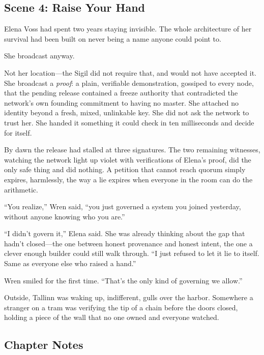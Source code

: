 \hypertarget{scene-4-raise-your-hand}{%
\subsection{Scene 4: Raise Your
Hand}\label{scene-4-raise-your-hand}}

Elena Voss had spent two years staying invisible. The whole architecture of her
survival had been built on never being a name anyone could point to.

She broadcast anyway.

Not her location---the Sigil did not require that, and would not have accepted
it. She broadcast a \emph{proof}: a plain, verifiable demonstration, gossiped to
every node, that the pending release contained a freeze authority that
contradicted the network's own founding commitment to having no master. She
attached no identity beyond a fresh, mixed, unlinkable key. She did not ask the
network to trust her. She handed it something it could check in ten
milliseconds and decide for itself.

By dawn the release had stalled at three signatures. The two remaining
witnesses, watching the network light up violet with verifications of Elena's
proof, did the only safe thing and did nothing. A petition that cannot reach
quorum simply expires, harmlessly, the way a lie expires when everyone in the
room can do the arithmetic.

``You realize,'' Wren said, ``you just governed a system you joined yesterday,
without anyone knowing who you are.''

``I didn't govern it,'' Elena said. She was already thinking about the gap that
hadn't closed---the one between honest provenance and honest intent, the one a
clever enough builder could still walk through. ``I just refused to let it lie
to itself. Same as everyone else who raised a hand.''

Wren smiled for the first time. ``That's the only kind of governing we allow.''

Outside, Tallinn was waking up, indifferent, gulls over the harbor. Somewhere a
stranger on a tram was verifying the tip of a chain before the doors closed,
holding a piece of the wall that no one owned and everyone watched.

\hypertarget{chapter-7-notes}{%
\subsection{Chapter Notes}\label{chapter-7-notes}}

